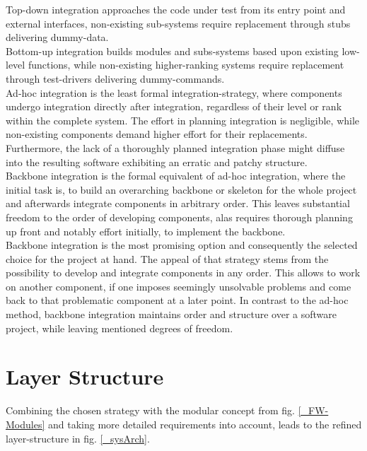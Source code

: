 		Top-down integration approaches the code under test from its entry point and external interfaces, non-existing sub-systems require replacement through stubs delivering dummy-data. \\
		
		Bottom-up integration builds modules and subs-systems based upon existing low-level functions, while non-existing higher-ranking systems require replacement through test-drivers delivering dummy-commands. \\
		
		Ad-hoc integration is the least formal integration-strategy, where components undergo integration directly after integration, regardless of their level or rank within the complete system. The effort in planning integration is negligible, while non-existing components demand higher effort for their replacements. Furthermore, the lack of a thoroughly planned integration phase might diffuse into the resulting software exhibiting an erratic and patchy structure. \\
		
		Backbone integration \cite{Beizer90} is the formal equivalent of ad-hoc integration, where the initial task is, to build an overarching backbone or skeleton for the whole project and afterwards integrate components in arbitrary order. This leaves substantial freedom to the order of developing components, alas requires thorough planning up front and notably effort initially, to implement the backbone. \\

		Backbone integration is the most promising option and consequently the selected choice for the project at hand. The appeal of that strategy stems from the possibility to develop and integrate components in any order. This allows to work on another component, if one imposes seemingly unsolvable problems and come back to that problematic component at a later point. In contrast to the ad-hoc method, backbone integration maintains order and structure over a software project, while leaving mentioned degrees of freedom. \\

	\section{Layer Structure}
	Combining the chosen strategy with the modular concept from fig. \ref{_FW-Modules} and taking more detailed requirements into account, leads to the refined layer-structure in fig. \ref{_sysArch}.

